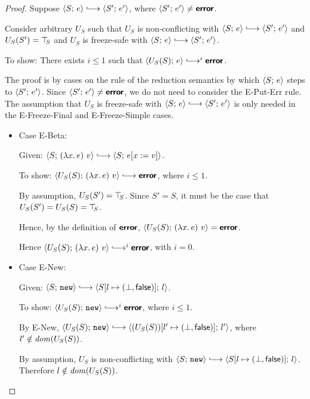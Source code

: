 \begin{proof}
  Suppose $\config{S}{e} \parstepsto \config{S'}{e'}$, where
  $\langle S';\, e' \rangle \neq \textbf{\textsf{error}}$.


  Consider arbitrary $U_S$ such that $U_S$ is non-conflicting with
  $\config{S}{e} \parstepsto \config{S'}{e'}$ and $U_S(S') = \top\hspace{-0.85mm}_{S}$
  and $U_S$ is freeze-safe with $\config{S}{e} \parstepsto
  \config{S'}{e'}$.

  To show: There exists $i \leq 1$ such that $\config{U_S(S)}{e}
  \parstepsto^i \error$.

  The proof is by cases on the rule of the reduction semantics by
  which $\langle S;\, e \rangle$ steps to $\langle S';\, e' \rangle$.  Since
  $\langle S';\, e' \rangle \neq \textbf{\textsf{error}}$, we do not need to consider the {\sc
    E-Put-Err} rule.  The assumption that $U_S$ is freeze-safe with
  $\config{S}{e} \parstepsto \config{S'}{e'}$ is only needed in the
  {\sc E-Freeze-Final} and {\sc E-Freeze-Simple} cases.

  \begin{itemize}

  \item Case {\sc E-Beta}:

    Given: $\config{S}{\app{(\lam{x}{e})}{v}} \parstepsto
    \config{S}{\subst{e}{x}{v}}$.

    To show: $\config{U_S(S)}{\app{(\lam{x}{e})}{v}} \parstepsto
    \error$, where $i \leq 1$.

    By assumption, $U_S(S') = \top\hspace{-0.85mm}_{S}$.  Since $S' = S$, it must be the
    case that $U_S(S') = U_S(S) = \top\hspace{-0.85mm}_{S}$.

    Hence, by the definition of $\textbf{\textsf{error}}$,
    $\langle U_S(S);\, (\lambda x.\,e)~v \rangle = \textbf{\textsf{error}}$.

    Hence $\config{U_S(S)}{\app{(\lam{x}{e})}{v}} \parstepsto^i
    \error$, with $i = 0$.

  \item Case {\sc E-New}:

    Given: $\config{S}{\NEW} \parstepsto
    \config{\extS{S}{l}{\bot}{\frozenfalse}}{l}$.

    To show: $\config{U_S(S)}{\NEW} \parstepsto^i \error$, where $i
    \leq 1$.

    By {\sc E-New}, $\config{U_S(S)}{\NEW} \parstepsto
    \config{\extS{(U_S(S))}{l'}{\bot}{\frozenfalse}}{l'}$, where $l'
    \notin \mathit{dom}(U_S(S))$.

    By assumption, $U_S$ is non-conflicting with $\config{S}{\NEW}
    \parstepsto \config{\extS{S}{l}{\bot}{\frozenfalse}}{l}$.
    Therefore $l \notin \mathit{dom}(U_S(S))$.


\end{itemize}
\end{proof}
